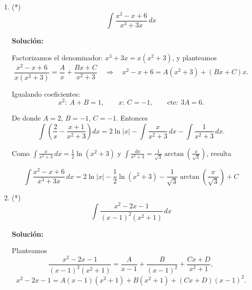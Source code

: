 \documentclass[12pt]{article}
\newcommand{\solucion}{%
    \vspace{0.8em}%
    \textbf{Solución:}%
}
\begin{document}
\begin{enumerate}[label=\alph*.-]
    \solucion

    Como el numerador y el denominador tienen el mismo grado, dividimos
    primero:
    \[
    \frac{x^3-2x^2-4}{x^3-2x^2}=1-\frac{4}{x^3-2x^2}=1-\frac{4}{x^2(x-2)}.
    \]

    Descomponemos $\dfrac{4}{x^2(x-2)}=\dfrac{A}{x}+\dfrac{B}{x^2}+\dfrac{C}{x-2}$:
    \[
    4=Ax(x-2)+B(x-2)+Cx^2.
    \]

    Con $x=0$: $4=-2B\Rightarrow B=-2$.
    Con $x=2$: $4=4C\Rightarrow C=1$.
    Igualando coeficientes de $x^2$: $0=A+C\Rightarrow A=-1$.

    Entonces
    \[
    \frac{4}{x^2(x-2)}=-\frac1x-\frac{2}{x^2}+\frac{1}{x-2},
    \]
    y por lo tanto
    \[
    \frac{x^3-2x^2-4}{x^3-2x^2}=1+\frac1x+\frac{2}{x^2}-\frac{1}{x-2}.
    \]

    Integrando:
    \[
    \int\left(1+\frac1x+\frac{2}{x^2}-\frac{1}{x-2}\right)dx
    =x+\ln|x|-\frac2x-\ln|x-2|+C.
    \]

    \[
    \boxed{
    \int\frac{x^3-2x^2-4}{x^3-2x^2}\,dx
    =x-\frac2x+\ln\left|\frac{x}{x-2}\right|+C
    }
    \]


    \item (*)
    \[
    \int\frac{x^2-x+6}{x^3+3x}\,dx
    \]

    \solucion

    Factorizamos el denominador: $x^3+3x=x(x^2+3)$, y planteamos
    \[
    \frac{x^2-x+6}{x(x^2+3)}=\frac{A}{x}+\frac{Bx+C}{x^2+3}
    \quad\Rightarrow\quad
    x^2-x+6=A(x^2+3)+(Bx+C)x.
    \]

    Igualando coeficientes:
    \[
    x^2:\ A+B=1,\qquad x:\ C=-1,\qquad \text{cte}:\ 3A=6.
    \]

    De donde $A=2$, $B=-1$, $C=-1$. Entonces
    \[
    \int\left(\frac2x-\frac{x+1}{x^2+3}\right)dx
    =2\ln|x|-\int\frac{x}{x^2+3}\,dx-\int\frac{1}{x^2+3}\,dx.
    \]

    Como $\displaystyle\int\frac{x}{x^2+3}\,dx=\frac12\ln(x^2+3)$ y
    $\displaystyle\int\frac{dx}{x^2+3}=\frac{1}{\sqrt3}\arctan\left(\frac{x}{\sqrt3}\right)$,
    resulta

    \[
    \boxed{
    \int\frac{x^2-x+6}{x^3+3x}\,dx
    =2\ln|x|-\frac12\ln(x^2+3)-\frac{1}{\sqrt3}\arctan\left(\frac{x}{\sqrt3}\right)+C
    }
    \]


    \item (*)
    \[
    \int\frac{x^2-2x-1}{(x-1)^2(x^2+1)}\,dx
    \]

    \solucion

    Planteamos
    \[
    \frac{x^2-2x-1}{(x-1)^2(x^2+1)}
    =\frac{A}{x-1}+\frac{B}{(x-1)^2}+\frac{Cx+D}{x^2+1},
    \]
    \[
    x^2-2x-1=A(x-1)(x^2+1)+B(x^2+1)+(Cx+D)(x-1)^2.
    \]


\end{enumerate}
\end{document}
